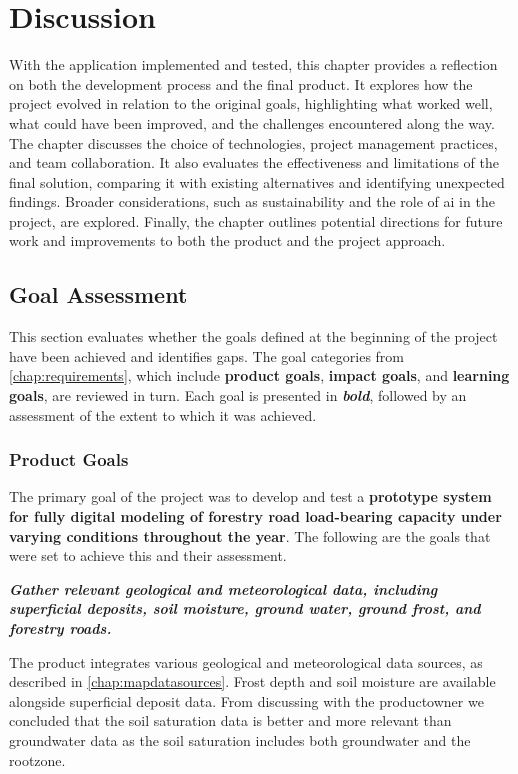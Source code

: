 \chapter{Discussion}\label{chap:discussion}

With the application implemented and tested, this chapter provides a reflection on both the development process and the final product. It explores how the project evolved in relation to the original goals, highlighting what worked well, what could have been improved, and the challenges encountered along the way. The chapter discusses the choice of technologies, project management practices, and team collaboration. It also evaluates the effectiveness and limitations of the final solution, comparing it with existing alternatives and identifying unexpected findings. Broader considerations, such as sustainability and the role of \acrfull{ai} in the project, are explored. Finally, the chapter outlines potential directions for future work and improvements to both the product and the project approach.

\section{Goal Assessment}

This section evaluates whether the goals defined at the beginning of the project have been achieved and identifies gaps. The goal categories from \autoref{chap:requirements}, which include \textbf{product goals}, \textbf{impact goals}, and \textbf{learning goals}, are reviewed in turn. Each goal is presented in \textit{\textbf{bold}}, followed by an assessment of the extent to which it was achieved.

\subsection{Product Goals}

The primary goal of the project was to develop and test a \textbf{prototype system for fully digital modeling of forestry road load-bearing capacity under varying conditions throughout the year}. The following are the goals that were set to achieve this and their assessment.   

\textbf{\textit{Gather relevant geological and meteorological data, including superficial deposits, soil moisture, ground water, ground frost, and forestry roads.}}

The product integrates various geological and meteorological data sources, as described in \autoref{chap:mapdatasources}. Frost depth and soil moisture are available alongside superficial deposit data. From discussing with the \Gls{productowner} we concluded that the soil saturation data is better and more relevant than \gls{groundwater} data as the soil saturation includes both \gls{groundwater} and the \gls{rootzone}. 

